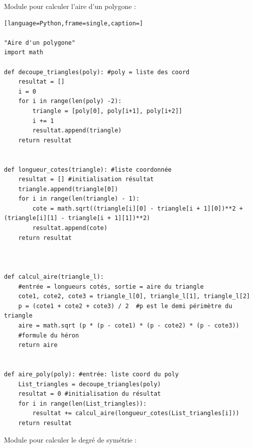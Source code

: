 \documentclass[a4paper,reqno]{article}
\begin{document}
Module pour calculer l'aire d'un polygone : 

\begin{lstlisting}[language=Python,frame=single,caption=]

"Aire d'un polygone"
import math

def decoupe_triangles(poly): #poly = liste des coord
    resultat = []
    i = 0
    for i in range(len(poly) -2):
        triangle = [poly[0], poly[i+1], poly[i+2]]
        i += 1
        resultat.append(triangle)
    return resultat


def longueur_cotes(triangle): #liste coordonnée
    resultat = [] #initialisation résultat
    triangle.append(triangle[0])
    for i in range(len(triangle) - 1):
        cote = math.sqrt((triangle[i][0] - triangle[i + 1][0])**2 + (triangle[i][1] - triangle[i + 1][1])**2)
        resultat.append(cote)
    return resultat



def calcul_aire(triangle_l): 
	#entrée = longueurs cotés, sortie = aire du triangle
    cote1, cote2, cote3 = triangle_l[0], triangle_l[1], triangle_l[2]
    p = (cote1 + cote2 + cote3) / 2  #p est le demi périmètre du triangle
    aire = math.sqrt (p * (p - cote1) * (p - cote2) * (p - cote3)) 
    #formule du héron
    return aire


def aire_poly(poly): #entrée: liste coord du poly
    List_triangles = decoupe_triangles(poly)
    resultat = 0 #initialisation du résultat
    for i in range(len(List_triangles)):
        resultat += calcul_aire(longueur_cotes(List_triangles[i]))
    return resultat

\end{lstlisting}
\vspace{2cm}

Module pour calculer le degré de symétrie :
\end{document}
